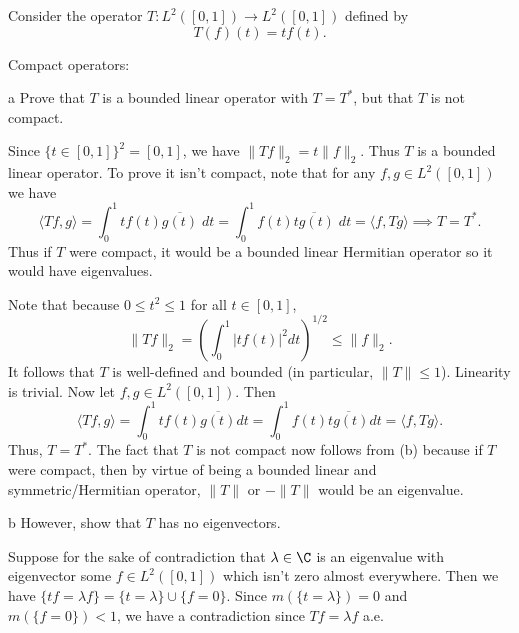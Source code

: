 \documentclass[11pt,letterpaper]{article}
\begin{document}
\begin{problem}
    Consider the operator $T: L^2([0,1]) \to L^2([0,1])$ defined by
\[
T(f)(t)=tf(t).
\]
\end{problem}
\begin{solution}
    Compact operators:
    \begin{partproblem}{a}
        Prove that $T$ is a bounded linear operator with $T=T^*$, but that $T$ is not compact.
    \end{partproblem}

    \quad Since $\{t\in [0,1]\}^2 = [0,1]$, we have $\|Tf\|_2 = t\|f\|_2$. Thus $T$ is a bounded linear operator. To prove it isn't compact, note that for any $f,g\in L^2([0,1])$ we have
    \[
        \big\langle Tf, g \big\rangle = \int_0^1 tf(t)\overline{g(t)}\;dt = \int_0^1 f(t)\overline{tg(t)}\;dt = \big\langle f, Tg \big\rangle \implies T = T^*
    .\] 
    Thus if $T$ were compact, it would be a bounded linear Hermitian operator so it would have eigenvalues.

    \quad Note that because $0 \leq t^2 \leq 1$ for all $t \in [0,1]$,
    \[
    \|Tf\|_2 = \left(\int_0^1 |tf(t)|^2dt\right)^{1/2} \leq \|f\|_2.
    \]
    It follows that $T$ is well-defined and bounded (in particular, $\|T\| \leq 1$). Linearity is trivial. Now let $f,g \in L^2([0,1])$. Then
    \[
    \langle Tf,g \rangle = \int_0^1 tf(t)\overline{g(t)}dt = \int_0^1 f(t)\overline{tg(t)}dt = \langle f, Tg \rangle.
    \]
    Thus, $T = T^*$. The fact that $T$ is not compact now follows from (b) because if $T$ were compact, then by virtue of being a bounded linear and symmetric/Hermitian operator, $\|T\|$ or $-\|T\|$ would be an eigenvalue.

    \begin{partproblem}{b}
        However, show that $T$ has no eigenvectors.
    \end{partproblem}

    \quad Suppose for the sake of contradiction that $\lambda\in \C$ is an eigenvalue with eigenvector some $f\in L^2([0,1])$ which isn't zero almost everywhere. Then we have $\{tf = \lambda f\} = \{t = \lambda\}\cup \{f = 0\}$. Since $m(\{t = \lambda\}) = 0$ and $m(\{f = 0\}) < 1$, we have a contradiction since $Tf = \lambda f$ a.e.
\end{solution}
\end{document}
